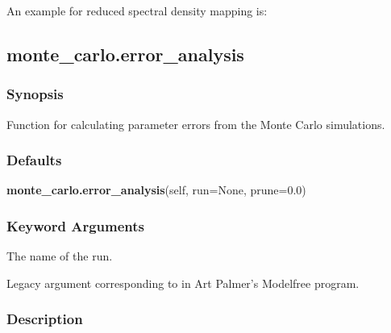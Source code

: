 


An example for reduced spectral density mapping  is:








\newpage

\subsection{monte\_carlo.error\_analysis}


\subsubsection{Synopsis}

Function for calculating parameter errors from the Monte Carlo simulations.

\subsubsection{Defaults}

\textsf{\textbf{monte\_carlo.error\_analysis}(self, run=None, prune=0.0)}


\subsubsection{Keyword Arguments}


  The name of the run.

  Legacy argument corresponding to 
 in Art Palmer's Modelfree program.

\subsubsection{Description}

